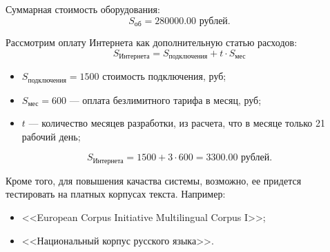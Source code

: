 Суммарная стоимость оборудования:
\[
	S_{\text{об}} = 280000.00 \text { рублей}.
\]

Рассмотрим оплату Интернета как дополнительную статью расходов:
\[
	S_{\text{Интернета}} = S_{\text{подключения}}  +  t \cdot S_{\text{мес}}
\]
\begin{itemize}
	\item  $S_{\text{подключения}}  = 1500 $ стоимость подключения, руб;
	\item  $S_{\text{мес}} = 600 $ --- оплата безлимитного тарифа в месяц, руб;
	\item  $t$ --- количество месяцев разработки, из расчета, что в месяце только 21 рабочий день;
\end{itemize}
\[
	S_{\text{Интернета}} = 1500 +  3 \cdot 600 = 3300.00 \text{ рублей}.
\]

Кроме того, для повышения качаства системы, возможно, ее придется тестировать на платных корпусах текста.
Например:
\begin{itemize}
	\item  <<European Corpus Initiative Multilingual Corpus I>>;
	\item  <<Национальный корпус русского языка>>.
\end{itemize}

